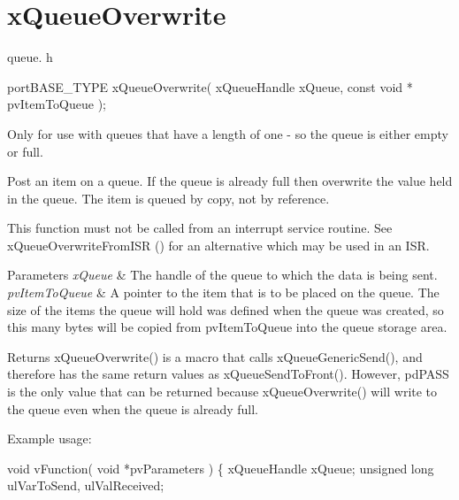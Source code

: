 \hypertarget{group__x_queue_overwrite}{\section{x\-Queue\-Overwrite}
\label{group__x_queue_overwrite}
}
queue. h 
\begin{DoxyPre}
 portBASE\_TYPE xQueueOverwrite(
                                                          xQueueHandle xQueue,
                                                          const void * pvItemToQueue
                                                 );
   \end{DoxyPre}


Only for use with queues that have a length of one -\/ so the queue is either empty or full.

Post an item on a queue. If the queue is already full then overwrite the value held in the queue. The item is queued by copy, not by reference.

This function must not be called from an interrupt service routine. See x\-Queue\-Overwrite\-From\-I\-S\-R () for an alternative which may be used in an I\-S\-R.


\begin{DoxyParams}{Parameters}
{\em x\-Queue} & The handle of the queue to which the data is being sent.\\
\hline
{\em pv\-Item\-To\-Queue} & A pointer to the item that is to be placed on the queue. The size of the items the queue will hold was defined when the queue was created, so this many bytes will be copied from pv\-Item\-To\-Queue into the queue storage area.\\
\hline
\end{DoxyParams}
\begin{DoxyReturn}{Returns}
x\-Queue\-Overwrite() is a macro that calls x\-Queue\-Generic\-Send(), and therefore has the same return values as x\-Queue\-Send\-To\-Front(). However, pd\-P\-A\-S\-S is the only value that can be returned because x\-Queue\-Overwrite() will write to the queue even when the queue is already full.
\end{DoxyReturn}
Example usage\-: 
\begin{DoxyPre}\end{DoxyPre}



\begin{DoxyPre} void vFunction( void *pvParameters )
 \{
 xQueueHandle xQueue;
 unsigned long ulVarToSend, ulValReceived;\end{DoxyPre}



